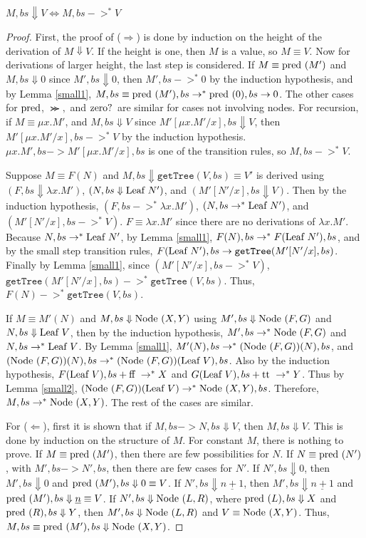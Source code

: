 \begin{theorem}
$M, bs\Downarrow V \iff M, bs ->^{*} V$
\end{theorem}
\begin{proof}
First, the proof of ($\Rightarrow$) is done by induction on the height of the derivation of $M\Downarrow V$.  If the height is one, then $M$ is a value, so $M\equiv V$.  Now for derivations of larger height, the last step is considered.  If $M\equiv \textrm{pred }(M')$ and $M, bs \Downarrow 0$ since $M', bs \Downarrow 0$, then $M', bs ->^{*}0$ by the induction hypothesis, and by Lemma \ref{small1}, $M, bs \equiv \textrm{pred }(M'), bs ->^{*} \textrm{pred }(0), bs -> 0$.  The other cases for $\textrm{pred }\!\!$, $\Succ\!\!,$ and $\textrm{zero? }\!\!$ are similar for cases not involving nodes.  For recursion, if $M\equiv \mu x.M'$, and $M, bs \Downarrow V$ since $M'[\mu x.M'/x], bs \Downarrow V$, then $M'[\mu x.M'/x], bs ->^{*}V$ by the induction hypothesis.  $\mu x.M', bs -> M'[\mu x.M'/x], bs$ is one of the transition rules, so $M, bs ->^{*} V$.

Suppose $M\equiv F(N)$ and $M, bs\Downarrow \texttt{getTree}(V,bs)\equiv V'$ is derived using $(F,bs\Downarrow \lambda x.M')$, ${(N,bs\Downarrow \textrm{Leaf } N')}$, 
and $(M'[N'/x], bs\Downarrow V)$.  Then by the induction hypothesis, $(F,bs ->^{*} \lambda x.M')$, $(N,bs ->^{*} \textrm{Leaf } N')$, 
and $(M'[N'/x], bs ->^{*} V)$.  $F\equiv \lambda x.M'$ since there are no derivations of $\lambda x.M'$.  Because $N,bs ->^{*} \textrm{Leaf } N'$, by Lemma \ref{small1}, $F(N), bs ->^{*} F(\textrm{Leaf } N'), bs$, and by the small step transition rules, $F(\textrm{Leaf } N'), bs -> \texttt{getTree}(M'[N'/x], bs)$.  Finally by Lemma \ref{small1}, since $(M'[N'/x], bs ->^{*} V)$, $\texttt{getTree}(M'[N'/x], bs) ->^{*} \texttt{getTree}(V, bs)$.  Thus, $F(N) ->^{*} \texttt{getTree}(V,bs)$.

If $M\equiv M'(N)$ and $M,bs \Downarrow \textrm{Node }(X,Y)$ using $M',bs \Downarrow \textrm{Node }(F,G)$ and $N,bs\Downarrow \textrm{Leaf } V$, then by the induction hypothesis, $M',bs ->^{*} \textrm{Node }(F,G)$ and $N,bs->^{*} \textrm{Leaf } V$.  By Lemma \ref{small1}, $M'(N), bs ->^{*} (\textrm{Node }(F,G))(N), bs$, and $(\textrm{Node }(F,G))(N), bs ->^{*} (\textrm{Node }(F,G))(\textrm{Leaf } V), bs$.  Also by the induction hypothesis, $F(\textrm{Leaf } V), bs+\textrm{ff } ->^{*} X$ and $G(\textrm{Leaf } V), bs+\textrm{tt } ->^{*} Y$.  Thus by Lemma \ref{small2}, $(\textrm{Node }(F,G))(\textrm{Leaf } V) ->^{*} \textrm{Node }(X,Y), bs$.  Therefore, $M,bs ->^{*} \textrm{Node }(X,Y)$.  The rest of the cases are similar.

For ($\Leftarrow$), first it is shown that if $M, bs -> N, bs \Downarrow V$, then $M, bs \Downarrow V$.  This is done by induction on the structure of $M$.  For constant $M$, there is nothing to prove.  If $M\equiv \textrm{pred }(M')$, then there are few possibilities for $N$.  If $N\equiv \textrm{pred }(N')$, with $M', bs-> N', bs$, then there are few cases for $N'$.  If $N', bs \Downarrow 0$, then $M', bs \Downarrow 0$ and $\textrm{pred }(M'), bs \Downarrow 0 \equiv V$.  If $N', bs \Downarrow \underline{n+1}$, then $M', bs \Downarrow \underline{n+1}$ and $\textrm{pred }(M'), bs \Downarrow \underline{n} \equiv V$.  If $N', bs \Downarrow \textrm{Node }(L,R)$, where $\textrm{pred }(L),bs\Downarrow X$ and $\textrm{pred }(R),bs\Downarrow Y$, then $M', bs \Downarrow \textrm{Node }(L,R)$ and $V\equiv \textrm{Node }(X,Y)$.  Thus, $M, bs \equiv \textrm{pred }(M'), bs \Downarrow \textrm{Node }(X,Y)$.  


\end{proof}
